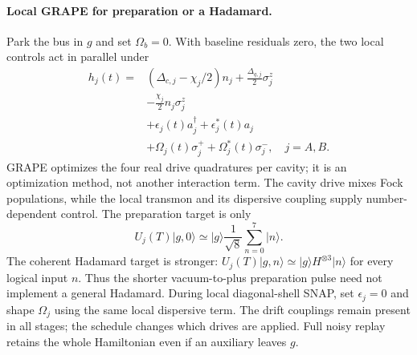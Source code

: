 \documentclass[aps,prb,reprint,amsmath,amssymb,nofootinbib]{revtex4-2}
\newcommand{\ket}[1]{\lvert#1\rangle}
\begin{document}
\paragraph{Local GRAPE for preparation or a Hadamard.}
Park the bus in $g$ and set $\Omega_b=0$. With baseline residuals zero,
the two local controls act in parallel under
\begin{align}
 h_j(t)={}&(\Delta_{c,j}-\chi_j/2)n_j
             +\frac{\Delta_{q,j}}2\sigma_j^z\nonumber\\
 &-\frac{\chi_j}{2}n_j\sigma_j^z\nonumber\\
 &+\epsilon_j(t)a_j^\dagger+\epsilon_j^*(t)a_j\nonumber\\
 &+\Omega_j(t)\sigma_j^++\Omega_j^*(t)\sigma_j^-,
 \quad j=A,B.
 \label{eq:localgrape}
\end{align}
GRAPE optimizes the four real drive quadratures per cavity; it is an
optimization method, not another interaction term. The cavity drive
mixes Fock populations, while the local transmon and its dispersive
coupling supply number-dependent control.\cite{Krastanov2015}
The preparation target is only
\begin{equation}
 U_j(T)\ket{g,0}\simeq\ket g\frac1{\sqrt8}
                         \sum_{n=0}^{7}\ket n.
\end{equation}
The coherent Hadamard target is stronger:
$U_j(T)\ket{g,n}\simeq\ket g H^{\otimes3}\ket n$ for every logical
input $n$. Thus the shorter vacuum-to-plus preparation pulse need not
implement a general Hadamard. During local diagonal-shell SNAP, set
$\epsilon_j=0$ and shape $\Omega_j$ using the same local dispersive term.
The drift couplings remain present in all stages; the schedule changes
which drives are applied. Full noisy replay retains the whole
Hamiltonian even if an auxiliary leaves $g$.
\end{document}
